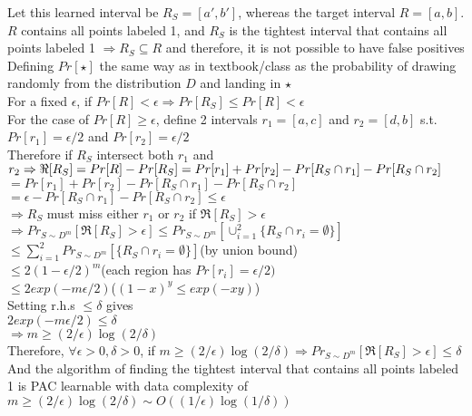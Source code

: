 \documentclass[11pt, oneside]{article}   	%
\begin{document}
\indent Let this learned interval be $R_S=[a',b']$, whereas the target interval $R=[a,b]$. \\
\indent $R$ contains all points labeled 1, and $R_S$ is the tightest interval that contains all points labeled 1 $\Rightarrow R_S\subseteq R$ and therefore, it is not possible to have false positives\\
\indent Defining $Pr[\star]$ the same way as in textbook/class as the probability of drawing randomly from the distribution $D$ and landing in $\star$\\
\indent For a fixed $\epsilon$, if $Pr[R]<\epsilon \Rightarrow Pr[R_S]\leq Pr[R]<\epsilon$\\
\indent For the case of $Pr[R]\geq\epsilon$, define 2 intervals $r_1=[a,c]$ and $r_2=[d,b]$ s.t.\\
\indent\indent$Pr[r_1]=\epsilon /2$ and $Pr[r_2]=\epsilon /2$\\
\indent Therefore if $R_S$ intersect both $r_1$ and $r_2\Rightarrow\\\Re[R_S]=Pr[R]-Pr[R_S]=Pr[r_1]+Pr[r_2]-Pr[R_S\cap r_1] - Pr[R_S\cap r_2]$\\
\indent\indent$=Pr[r_1] + Pr[r_2]-Pr[R_S \cap r_1] - Pr[R_S \cap r_2]$\\
\indent\indent$=\epsilon-Pr[R_S \cap r_1] - Pr[R_S \cap r_2]\leq\epsilon$\\
\indent$\Rightarrow R_S$ must miss either $r_1$ or $r_2$ if $\Re[R_S]>\epsilon$\\
\indent$\Rightarrow Pr_{S\sim D^m}[\Re[R_S]>\epsilon]\leq Pr_{S\sim D^m}[\cup_{i=1}^2\{R_S\cap r_i=\emptyset\}]$\\
\indent\indent$\leq\sum_{i=1}^2 Pr_{S\sim D^m}[\{R_S \cap r_i = \emptyset\}]$\hfill (by union bound)\\
\indent\indent$\leq 2(1-\epsilon / 2)^m$\hfill (each region has $Pr[r_i]=\epsilon /2)$\\
\indent\indent$\leq 2 exp(-m\epsilon /2)$\hfill ($(1-x)^y\leq exp(-xy)$)\\
\indent Setting r.h.s $\leq\delta$ gives\\
\indent\indent$2exp(-m\epsilon /2)\leq\delta$\\
\indent\indent$\Rightarrow m\geq (2/\epsilon) \log(2/\delta)$\\

Therefore, $\forall\epsilon>0,\delta>0$, if $m\geq (2/\epsilon)\log(2/\delta)\Rightarrow Pr_{S\sim D^m}[\Re[R_S]>\epsilon]\leq\delta$\\
And the algorithm of finding the tightest interval that contains all points labeled 1 is PAC learnable with data complexity of $m\geq(2/\epsilon)\log(2/\delta)\sim O((1/\epsilon) \log(1/\delta))$\\
\end{document}
